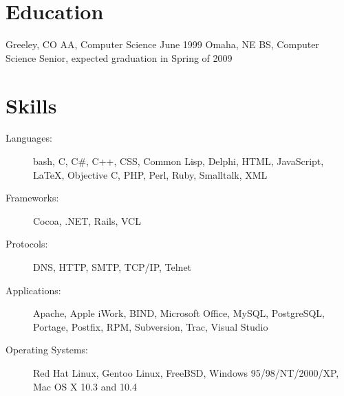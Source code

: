 \documentclass{resume}
\begin{document}
\section{Education}
\begin{itemize}
             {Greeley, CO}
             {AA, Computer Science}
             {June 1999}
             {Omaha, NE}
             {BS, Computer Science}
             {Senior, expected graduation in Spring of 2009}
\end{itemize}

\section{Skills}
\begin{description}
\item[Languages:] bash, C, C\#, C++, CSS, Common Lisp, Delphi, HTML,
  JavaScript, \LaTeX, Objective C, PHP, Perl, Ruby, Smalltalk, XML
\item[Frameworks:] Cocoa, .NET, Rails, VCL
\item[Protocols:] DNS, HTTP, SMTP, TCP/IP, Telnet
\item[Applications:] Apache, Apple iWork, BIND, Microsoft Office, MySQL,
  PostgreSQL, Portage, Postfix, RPM, Subversion, Trac, Visual Studio
\item[Operating Systems:] Red Hat Linux, Gentoo Linux, FreeBSD, Windows
  95/98/NT/2000/XP, Mac OS X 10.3 and 10.4
\end{description}
\end{document}
